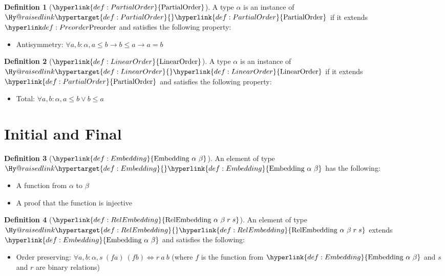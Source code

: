 \documentclass{article}
\makeatletter
\newcommand\newlink[2]{{\protect\hyperlink{#1}{\normalcolor #2}}}
\newcommand\newtarget[2]{\Hy@raisedlink{\hypertarget{#1}{}}#2}
\theoremstyle{definition}
\newtheorem{definition}{Definition}
\makeatother
\begin{document}
\newcommand\PartialOrder{\newlink{def:PartialOrder}{\text{PartialOrder}}}
\begin{definition}[$\PartialOrder$]
A type $\alpha$ is an instance of $\newtarget{def:PartialOrder}{\PartialOrder}$ if it extends $\Preorder$ and satisfies the following property:
\begin{itemize}
\item Antisymmetry: $\forall a,b : \alpha, a\le b \to b\le a \to a = b$
\end{itemize}
\end{definition}

\newcommand\LinearOrder{\newlink{def:LinearOrder}{\text{LinearOrder}}}
\begin{definition}[$\LinearOrder$]
A type $\alpha$ is an instance of $\newtarget{def:LinearOrder}{\LinearOrder}$ if it extends $\PartialOrder$ and satisfies the following property:
\begin{itemize}
\item Total: $\forall a,b : \alpha, a\le b \lor b\le a$
\end{itemize}
\end{definition}

\section*{Initial and Final}
\newcommand\Embedding[2]{\newlink{def:Embedding}{\text{Embedding } #1 \text{ } #2}}
\begin{definition}[$\Embedding{\alpha}{\beta}$]
An element of type $\newtarget{def:Embedding}{\Embedding{\alpha}{\beta}}$ has the following:
\begin{itemize}
\item A function from $\alpha$ to $\beta$
\item A proof that the function is injective
\end{itemize}
\end{definition}

\newcommand\RelEmbedding[4]{\newlink{def:RelEmbedding}{\text{RelEmbedding } #1 \text{ } #2 \; #3 \; #4}}
\begin{definition}[$\RelEmbedding{\alpha}{\beta}{r}{s}$]
An element of type $\newtarget{def:RelEmbedding}{\RelEmbedding{\alpha}{\beta}{r}{s}}$ extends $\Embedding{\alpha}{\beta}$ and satisfies the following:
\begin{itemize}
\item Order preserving: $\forall a,b : \alpha, s \  (f a) \ (f b) \iff r\  a\  b$
(where $f$ is the function from $\Embedding{\alpha}{\beta}$ and $s$ and $r$ are binary relations)
\end{itemize}
\end{definition}
\end{document}
